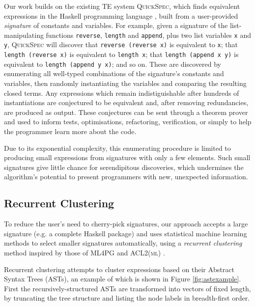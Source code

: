 \documentclass[]{default}
\begin{document}
Our work builds on the existing TE system
\textsc{QuickSpec}\cite{QuickSpec}, which finds equivalent expressions
in the Haskell programming language \cite{marlow2010haskell}, built from a user-provided
\emph{signature} of constants and variables. For example, given a
signature of the list-manipulating functions \texttt{reverse},
\texttt{length} and \texttt{append}, plus two list variables \texttt{x}
and \texttt{y}, \textsc{QuickSpec} will discover that
\texttt{reverse\ (reverse\ x)} is equivalent to \texttt{x}; that
\texttt{length\ (reverse\ x)} is equivalent to \texttt{length\ x}; that
\texttt{length\ (append\ x\ y)} is equivalent to
\texttt{length\ (append\ y\ x)}; and so on. These are discovered by
enumerating all well-typed combinations of the signature's constants and
variables, then randomly instantiating the variables \cite{claessen2011quickcheck} and comparing the
resulting closed terms. Any expressions which remain indistiguishable
after hundreds of instantiations are conjectured to be equivalent and,
after removing redundancies, are produced as output. These conjectures
can be sent through a theorem prover \cite{claessen2013automating} and used to inform tests,
optimisations, refactoring, verification, or simply to help the
programmer learn more about the code.

Due to its exponential complexity, this enumerating procedure is limited
to producing small expressions from signatures with only a few elements.
Such small signatures give little chance for serendipitous discoveries,
which undermines the algorithm's potential to present programmers with
new, unexpected information.

\subsection{Recurrent Clustering}\label{recurrent-clustering}

To reduce the user's need to cherry-pick signatures, our approach
accepts a large signature (e.g. a complete Haskell package) and uses
statistical machine learning methods to select smaller signatures
automatically, using a \emph{recurrent clustering} method inspired by
those of \textsc{ML4PG} \cite{journals/corr/abs-1212-3618} and \textsc{ACL2(ml)} \cite{Heras.Komendantskaya.Johansson.ea:2013}.

Recurrent clustering attempts to cluster expressions based on their
Abstract Syntax Trees (ASTs), an example of which is shown in Figure \ref{fig:astexample}. First the recursively-structured ASTs are
transformed into vectors of fixed length, by truncating the tree
structure and listing the node labels in breadth-first order.
\end{document}
